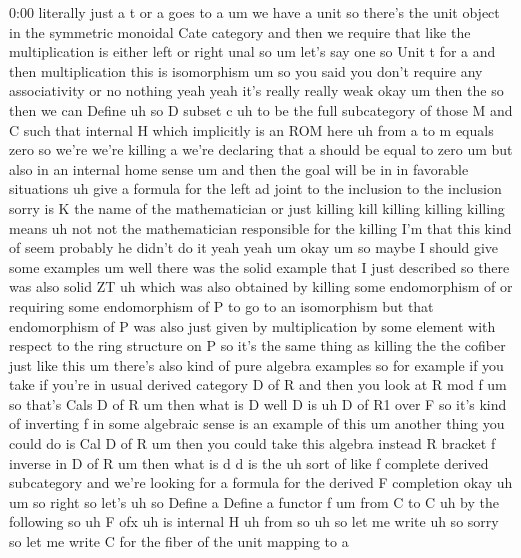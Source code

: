 \begin{unfinished}{0:00}
literally  just  a  t  or  a  goes  to  a  um  we
have  a  unit  so  there's  the  unit  object
in  the  symmetric  monoidal  Cate  category
and  then  we  require  that  like  the
multiplication  is  either  left  or  right
unal  so
um  let's  say
one  so
Unit  t  for  a  and  then
multiplication  this  is
isomorphism
um
so  you  said  you  don't  require  any
associativity  or  no  nothing  yeah  yeah
it's  really  really
weak  okay  um  then  the  so  then  we  can
Define
uh  so  D  subset  c  uh  to  be  the  full
subcategory  of  those  M  and  C  such  that
internal  H  which  implicitly  is  an  ROM
here  uh  from  a  to  m  equals
zero  so  we're  we're  killing  a  we're
declaring  that  a  should  be  equal  to  zero
um  but  also  in  an  internal  home
sense  um  and  then  the
goal  will  be  in  in  favorable
situations  uh  give  a
formula  for  the  left  ad  joint  to  the
inclusion  to  the
inclusion  sorry  is  K  the  name  of  the
mathematician  or  just  killing
kill  killing  killing  killing  means  uh
not  not  the  mathematician  responsible
for  the  killing  I'm  that  this  kind  of
seem  probably  he  didn't  do  it  yeah  yeah
um
okay
um  so  maybe  I  should  give  some  examples
um
well  there  was  the  solid  example  that  I
just  described
so  there  was  also  solid
ZT  uh  which  was  also  obtained  by  killing
some  endomorphism  of  or  requiring  some
endomorphism  of  P  to  go  to  an
isomorphism  but  that  endomorphism  of  P
was  also  just  given  by  multiplication  by
some  element  with  respect  to  the  ring
structure  on  P  so  it's  the  same  thing  as
killing  the  the  cofiber  just  like  this
um  there's  also  kind  of  pure  algebra
examples  so  for  example  if  you  take  if
you're  in  usual  derived  category  D  of  R
and  then  you  look  at  R  mod
f  um  so  that's  Cals  D  of  R  um  then  what
is  D  well  D  is  uh  D  of  R1  over  F  so  it's
kind  of  inverting  f  in  some  algebraic
sense  is  an  example  of
this  um  another  thing  you  could  do  is
Cal  D  of  R  um  then  you  could  take  this
algebra  instead  R  bracket  f  inverse  in  D
of
R  um  then  what  is  d  d  is
the  uh  sort  of  like  f  complete  derived
subcategory  and  we're  looking  for  a
formula  for  the  derived  F
completion
okay
uh
um
so
right  so  let's  uh  so  Define
a  Define  a  functor  f  um  from  C  to  C  uh
by  the  following  so  uh  F
ofx  uh  is  internal
H  uh  from
so  uh  so  let  me  write  uh  so  sorry  so  let
me  write  C  for  the  fiber  of  the  unit
mapping  to  a

\end{unfinished}
